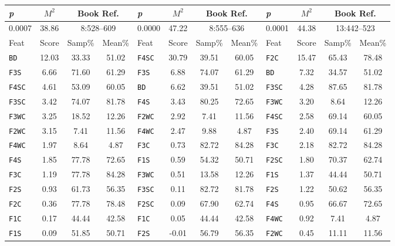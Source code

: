 \documentclass[11pt,a4paper]{scrartcl} %
\begin{document}
{\begin{table}[H]
{\begin{tabular}{ | l | c | c | c || l | c | c | c || l | c | c | c |}
\hline
\hline
\textit{p} & $M^{2}$ & \multicolumn{2}{c||}{Book Ref.} & \textit{p} & $M^{2}$ & \multicolumn{2}{c||}{Book Ref.} & \textit{p} & $M^{2}$ & \multicolumn{2}{c|}{Book Ref.} \\
\hline

0.0007 & 38.86 & \multicolumn{2}{c||}{ 8:528--609} & 0.0000 & 47.22 & \multicolumn{2}{c||}{ 8:555--636} & 0.0001 & 44.38 & \multicolumn{2}{c|}{13:442--523} \\

\hline
Feat & Score & Samp\% & Mean\% & Feat & Score & Samp\% & Mean\% & Feat & Score & Samp\% & Mean\% \\
\hline

\texttt{BD} & 12.03 & 33.33 & 51.02 & \texttt{F4SC} & 30.79 & 39.51 & 60.05 & \texttt{F2C} & 15.47 & 65.43 & 78.48 \\
\texttt{F3S} & 6.66 & 71.60 & 61.29 & \texttt{F3S} & 6.88 & 74.07 & 61.29 & \texttt{BD} & 7.32 & 34.57 & 51.02 \\
\texttt{F4SC} & 4.61 & 53.09 & 60.05 & \texttt{BD} & 6.62 & 39.51 & 51.02 & \texttt{F3SC} & 4.28 & 87.65 & 81.78 \\
\texttt{F3SC} & 3.42 & 74.07 & 81.78 & \texttt{F4S} & 3.43 & 80.25 & 72.65 & \texttt{F3WC} & 3.20 & 8.64 & 12.26 \\
\texttt{F3WC} & 3.25 & 18.52 & 12.26 & \texttt{F2WC} & 2.92 & 7.41 & 11.56 & \texttt{F4SC} & 2.58 & 69.14 & 60.05 \\
\texttt{F2WC} & 3.15 & 7.41 & 11.56 & \texttt{F4WC} & 2.47 & 9.88 & 4.87 & \texttt{F3S} & 2.40 & 69.14 & 61.29 \\
\texttt{F4WC} & 1.97 & 8.64 & 4.87 & \texttt{F3C} & 0.73 & 82.72 & 84.28 & \texttt{F3C} & 2.18 & 82.72 & 84.28 \\
\texttt{F4S} & 1.85 & 77.78 & 72.65 & \texttt{F1S} & 0.59 & 54.32 & 50.71 & \texttt{F2SC} & 1.80 & 70.37 & 62.74 \\
\texttt{F3C} & 1.19 & 77.78 & 84.28 & \texttt{F3WC} & 0.51 & 13.58 & 12.26 & \texttt{F1S} & 1.37 & 44.44 & 50.71 \\
\texttt{F2S} & 0.93 & 61.73 & 56.35 & \texttt{F3SC} & 0.11 & 82.72 & 81.78 & \texttt{F2S} & 1.22 & 50.62 & 56.35 \\
\texttt{F2C} & 0.36 & 77.78 & 78.48 & \texttt{F2SC} & 0.09 & 67.90 & 62.74 & \texttt{F4S} & 0.95 & 66.67 & 72.65 \\
\texttt{F1C} & 0.17 & 44.44 & 42.58 & \texttt{F1C} & 0.05 & 44.44 & 42.58 & \texttt{F4WC} & 0.92 & 7.41 & 4.87 \\
\texttt{F1S} & 0.09 & 51.85 & 50.71 & \texttt{F2S} & -0.01 & 56.79 & 56.35 & \texttt{F2WC} & 0.45 & 11.11 & 11.56 \\

\end{tabular}}
\end{table}}
\end{document}
